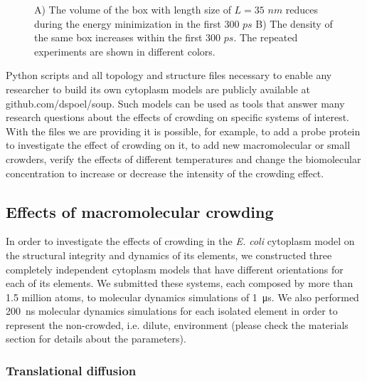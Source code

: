 \documentclass[journal=jacsat,manuscript=article]{achemso}
\begin{document}
\begin{figure}[H]

\caption{A) The volume of the box with length size of $L=35 \,\, nm$ reduces during the energy minimization in the first $300 \,\, ps$ B) The density of the same box increases within the first $300\,\, ps$. The repeated experiments are shown in different colors. }
\end{figure}



Python scripts and all topology and structure files necessary to enable any researcher to build its own cytoplasm models are publicly available at github.com/dspoel/soup. Such models can be used as tools that answer many research questions about the effects of crowding on specific systems of interest. With the files we are providing it is possible, for example, to add a probe protein to investigate the effect of crowding on it, to add new macromolecular or small crowders, verify the effects of different temperatures and change the biomolecular concentration to increase or decrease the intensity of the crowding effect.











\subsection{Effects of macromolecular crowding}

In order to investigate the effects of crowding in the \textit{E. coli} cytoplasm model on the structural integrity and dynamics of its elements, we constructed three completely independent cytoplasm models that have different orientations for each of its elements. We submitted these systems, each composed by more than 1.5 million atoms, to molecular dynamics simulations of \SI{1}{\micro\second}. We also performed \SI{200}{\nano\second} molecular dynamics simulations for each isolated element in order to represent the non-crowded, i.e. dilute, environment (please check the materials section for details about the parameters).









\subsubsection{Translational diffusion}
\end{document}
